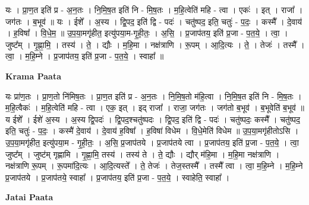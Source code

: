 \documentclass[17pt]{extarticle}
\begin{document}
यः । प्रा॒ण॒त इति॑ प्र - अ॒न॒तः । नि॒मि॒ष॒त इति॑ नि - मि॒ष॒तः । म॒हि॒त्वेति॑ महि - त्वा । एकः॑ । इत् । राजा᳚ । जग॑तः । ब॒भूव॑ ॥ यः । ईशे᳚ । अ॒स्य । द्वि॒पद॒ इति॑ द्वि - पदः॑ । चतु॑ष्पद॒ इति॒ चतुः॑ - प॒दः॒ । कस्मै᳚ । दे॒वाय॑ । ह॒विषा᳚ । वि॒धे॒म॒ ॥ उ॒प॒या॒मगृ॑हीत॒ इत्यु॑पया॒म-गृ॒ही॒तः॒ । अ॒सि॒ । प्र॒जाप॑तय॒ इति॑ प्र॒जा - प॒त॒ये॒ । त्वा॒ । जुष्ट᳚म् । गृ॒ह्णा॒मि॒ । तस्य॑ । ते॒ । द्यौः । म॒हि॒मा । नक्ष॑त्राणि । रू॒पम् । आ॒दि॒त्यः । ते॒ । तेजः॑ । तस्मै᳚ । त्वा॒ । म॒हि॒म्ने । प्र॒जाप॑तय॒ इति॑ प्र॒जा - प॒त॒ये॒ । स्वाहा᳚ ॥  \newline


\textbf{Krama Paata} \newline

यः प्रा॑ण॒तः । प्रा॒ण॒तो नि॑मिष॒तः । प्रा॒ण॒त इति॑ प्र - अ॒न॒तः । नि॒मि॒ष॒तो म॑हि॒त्वा । नि॒मि॒ष॒त इति॑ नि - मि॒ष॒तः । म॒हि॒त्वैकः॑ । म॒हि॒त्वेति॑ महि - त्वा । एक॒ इत् । इद् राजा᳚ । राजा॒ जग॑तः । जग॑तो ब॒भूव॑ । ब॒भूवेति॑ ब॒भूव॑ ॥ य ईशे᳚ । ईशे॑ अ॒स्य । अ॒स्य द्वि॒पदः॑ । द्वि॒पद॒श्चतु॑ष्पदः । द्वि॒पद॒ इति॑ द्वि - पदः॑ । चतु॑ष्पदः॒ कस्मै᳚ । चतु॑ष्पद॒ इति॒ चतुः॑ - प॒दः॒ । कस्मै॑ दे॒वाय॑ । दे॒वाय॑ ह॒विषा᳚ । ह॒विषा॑ विधेम । वि॒धे॒मेति॑ विधेम ॥ उ॒प॒या॒मगृ॑हीतोऽसि । उ॒प॒या॒मगृ॑हीत॒ इत्यु॑पया॒म - गृ॒ही॒तः॒ । अ॒सि॒ प्र॒जाप॑तये । प्र॒जाप॑तये त्वा । प्र॒जाप॑तय॒ इति॑ प्र॒जा - प॒त॒ये॒ । त्वा॒ जुष्ट᳚म् । जुष्ट॑म् गृह्णामि । गृ॒ह्णा॒मि॒ तस्य॑ । तस्य॑ ते । ते॒ द्यौः । द्यौर् म॑हि॒मा । म॒हि॒मा नक्ष॑त्राणि । नक्ष॑त्राणि रू॒पम् । रू॒पमा॑दि॒त्यः । आ॒दि॒त्यस्ते᳚ । ते॒ तेजः॑ । तेज॒स्तस्मै᳚ । तस्मै᳚ त्वा । त्वा॒ म॒हि॒म्ने । म॒हि॒म्ने प्र॒जाप॑तये । प्र॒जाप॑तये॒ स्वाहा᳚ । प्र॒जाप॑तय॒ इति॑ प्र॒जा - प॒त॒ये॒ । स्वाहेति॒ स्वाहा᳚ । \newline

\textbf{Jatai Paata} \newline
\end{document}
